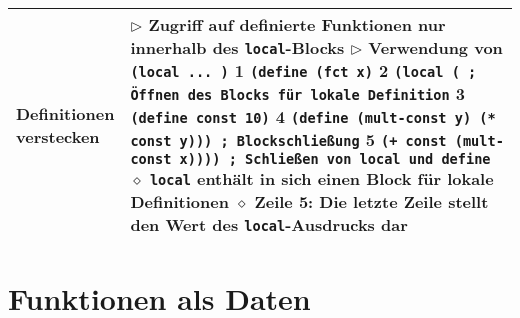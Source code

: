 \begin{tabular}{ | p{} p{} | }
  \makecell[l]{Definitionen \\ verstecken} & \makecell[l]{
  $\triangleright$ Zugriff auf definierte Funktionen nur innerhalb des \texttt{local}-Blocks \\
  $\triangleright$ Verwendung von \texttt{(local ... )} \\
  \hspace{0.4cm} 1 \hspace{0.1cm} \texttt{(define (fct x)} \\
  \hspace{0.4cm} 2 \hspace{0.5cm} \texttt{(local ( ; Öffnen des Blocks für lokale Definition} \\
  \hspace{0.4cm} 3 \hspace{0.7cm} \texttt{(define const 10)} \\
  \hspace{0.4cm} 4 \hspace{0.7cm} \texttt{(define (mult-const y) (* const y))) ; Blockschlie\ss ung} \\
  \hspace{0.4cm} 5 \hspace{0.5cm} \texttt{(+ const (mult-const x)))) ; Schlie\ss en von local und define} \\
  \hspace{0.4cm} $\diamond$ \texttt{local} enthält in sich einen Block für lokale Definitionen \\
  \hspace{0.4cm} $\diamond$ Zeile 5: Die letzte Zeile stellt den Wert des \texttt{local}-Ausdrucks dar} \\ \hline
  
  \end{tabular}

\section{Funktionen als Daten} 

